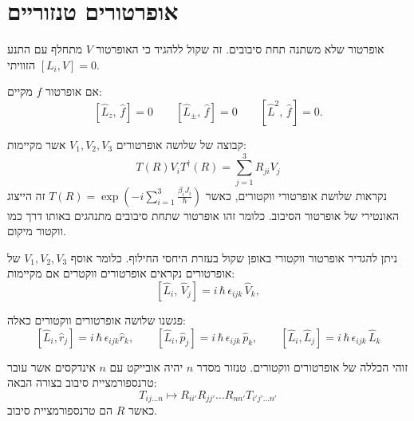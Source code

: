 \documentclass{tstextbook}
\begin{document}
\section{אופרטורים טנזוריים}

\begin{definition}
אופרטור שלא משתנה תחת סיבובים. זה שקול ללהגיד כי האופרטור \(V\)  מתחלף עם התנע הזוויתי \([L_{i},V]=0\).

\end{definition}
\begin{proposition}
אם אופרטור \(f\) מקיים:
$${{\left[\hat{L}_{z},\,\hat{f}\right]=0}}\qquad {{\left[\hat{L}_{\pm},\,\hat{f}\right]=0}} \qquad {{\left[\hat{L}^{2},\,\hat{f}\right]=0.}}$$

\end{proposition}
\begin{definition}
קבוצה של שלושה אופרטורים \(V_{1},V_{2},V_{3}\) אשר מקיימות:
$$T(R)V_{i}T^{\dagger}(R)=\sum_{j=1}^{3}R_{j i}V_{j}$$
נקראות שלושת אופרטורי ווקטורים, כאשר \(T(R)=\exp\left( -i\sum_{i=1}^{3}\frac{\beta_{i}J_{i}}{\hbar} \right)\) זה הייצוג האונטירי של אופרטור הסיבוב. כלומר זהו אופרטור שתחת סיבובים מתנהגים באותו דרך כמו ווקטור מיקום. 

\end{definition}
\begin{proposition}
ניתן להגדיר אופרטור ווקטורי באופן שקול בעזרת היחסי החילוף. כלומר אוסף \(V_{1},V_{2},V_{3}\) של אופרטורים נקראים אופרטורים ווקטרים אם מקיימות:
$$\left[\hat{L}_{i},\,\hat{V}_{j}\right]=i\,\hbar\,\epsilon_{i j k}\,\hat{V}_{k},$$

\end{proposition}
\begin{example}
פגשנו שלושה אופרטורים ווקטורים כאלה:
$$\left[\hat{L}_{i},\hat{r}_{j}\right]=i\,\hbar\,\epsilon_{i j k}\hat{r}_{k},\qquad\left[\hat{L}_{i},\hat{p}_{j}\right]=i\,\hbar\,\epsilon_{i j k}\,\hat{p}_{k},\qquad\left[\hat{L}_{i},\hat{L}_{j}\right]=i\,\hbar\,\epsilon_{i j k}\,\hat{L}_{k}$$

\end{example}
\begin{definition}
זוהי הכללה של אופרטורים ווקטורים. טנזור מסדר \(n\) יהיה אובייקט עם \(n\) אינדקסים אשר עובר טרנספורמציית סיבוב בצורה הבאה:
$$T_{ij \dots n}\mapsto R_{ii'}R_{jj'} \dots R_{nn'} T_{i' j' \dots n'}$$
כאשר \(R\) הם טרנספורמציית סיבוב.

\end{definition}
\end{document}
